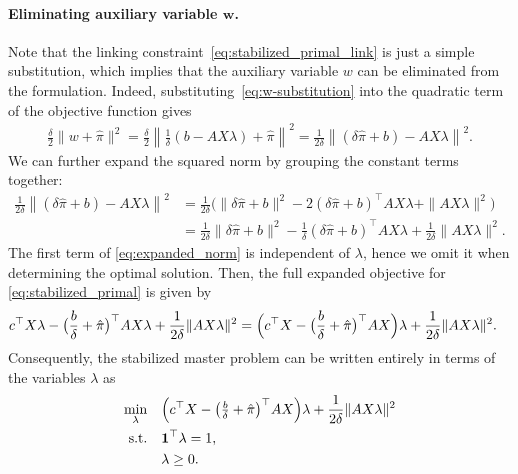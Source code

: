 \documentclass{book}
\theoremstyle{definition}
\numberwithin{algorithm_}{chapter}
\begin{document}
\paragraph{Eliminating auxiliary variable $\mathbf{w}$.}
Note that the linking constraint~\eqref{eq:stabilized_primal_link} is just a simple substitution, which implies that the auxiliary variable $w$ can be eliminated from the formulation. Indeed, substituting~\eqref{eq:w-substitution} into the quadratic term of the objective function gives
\begin{align}
\frac{\delta}{2}
\|
w + \hat{\pi}
\|^2
=
\frac{\delta}{2}
\left\|
\frac{1}{\delta}
(
b - A X \lambda
)
+
\hat{\pi}
\right\|^2
=
\frac{1}{2 \delta}
\left\|
(\delta \hat{\pi}
+
b) - A X \lambda
\right\|^2.
\end{align}
We can further expand the squared norm by grouping the constant terms together:
\begin{align}
\frac{1}{2 \delta}
\left\|
(\delta \hat{\pi}
+
b) - A X \lambda
\right\|^2
&=
\frac{1}{2 \delta}
\Big(
\|
\delta \hat{\pi} + b
\|^2
-
2
(\delta \hat{\pi} + b)^\top
A X \lambda
+
\|
A X \lambda
\|^2
\Big)
\\
&= 
\frac{1}{2 \delta}
\|
\delta \hat{\pi} + b
\|^2
-
\frac{1}{\delta}
(\delta \hat{\pi} + b)^\top
A X \lambda
+
\frac{1}{2 \delta}
\|
A X \lambda
\|^2. \label{eq:expanded_norm}
\end{align}
The first term of \eqref{eq:expanded_norm} is independent of $\lambda$, hence we omit it when determining the optimal solution.
Then, the full expanded objective for \eqref{eq:stabilized_primal} is given by
\begin{align}
c^\top X \lambda
- \bigl( \frac{b}{\delta} + \hat{\pi} \bigr)^\top A X \lambda
+ \frac{1}{2\delta} \| A X \lambda \|^2
&=
\Bigl( c^\top X - \bigl( \frac{b}{\delta} + \hat{\pi} \bigr)^\top A X \Bigr) \lambda
+ \frac{1}{2\delta} \| A X \lambda \|^2.
\end{align}
Consequently, the stabilized master problem can be written entirely in terms of the variables $\lambda$ as
\begin{subequations} \label{eq:stab-elminated}
\begin{align}
\min_{\lambda}
\quad
&
\Bigl( c^\top X - \bigl( \tfrac{b}{\delta} + \hat{\pi} \bigr)^\top A X \Bigr) \lambda
+ \frac{1}{2\delta} \| A X \lambda \|^2
\\
\text{s.t.}
\quad
&
\mathbf{1}^\top \lambda = 1,
\\
&
\lambda \ge 0.
\end{align}
\end{subequations}
\end{document}

